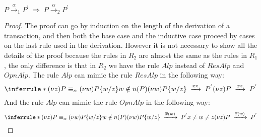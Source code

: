 \begin{theorem}
  $P\xrightarrow{\alpha}_{1}P^{'}\; \Rightarrow\; P\xrightarrow{\alpha}_{2}P^{'}$
  \begin{proof}
    The proof can go by induction on the length of the derivation of a transaction, and then both the base case and the inductive case proceed by cases on the last rule used in the derivation. However it is not necessary to show all the details of the proof because the rules in $R_{2}$ are almost the same as the rules in $R_{1}$, the only difference is that in $R_{2}$ we have the rule $Alp$ instead of $ResAlp$ and $OpnAlp$. The rule $Alp$ can mimic the rule $ResAlp$ in the following way:
	\[
	  \inferrule *{
	      (\nu z)P\equiv_{\alpha} (\nu w)P\{w/z\}
	    \\
	      w\notin n(P)
	    \\
	      (\nu w)P\{w/z\}\;
		\xrightarrow{xz}\;
		  P^{'}
	  }{
	    (\nu z)P\; 
	      \xrightarrow{xz}\;
		P^{'}
	  }
	\]
	And the rule $Alp$ can mimic the rule $OpnAlp$ in the following way:
	\[
	  \inferrule *{
	      (\nu z)P\equiv_{\alpha} (\nu w)P\{w/z\}
	    \\
	      w\notin n(P)
	    \\
	      (\nu w)P\{w/z\}\;
		\xrightarrow{\overline{x}(w)}\;
		  P^{'}
	    \\
	      x\neq w\neq z
	  }{
	    (\nu z)P\; 
	      \xrightarrow{\overline{x}(w)}\;
		P^{'}
	  }
	\]
  \end{proof}
\end{theorem}


